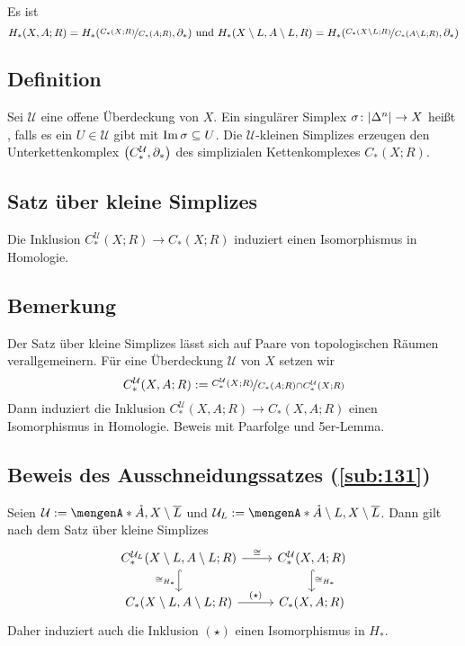 Es ist 
\[
	H_*(X,A;R) = H_* \enbrace*{\nicefrac{C_*(X;R)}{C_*(A;R)},\partial_*}  \text{ und } H_*\enbrace*{X\setminus L, A \setminus L,R} = H_* \enbrace*{ 
	\nicefrac{C_*(X \setminus L;R)}{C_*(A \setminus L;R)}, \partial_*}  
\]

\subsection[Definition: $\mathcal{U}$-klein]{Definition} %
\label{sub:132}
Sei $\mathcal{U}$ eine offene Überdeckung von $X$. Ein singulärer Simplex $\sigma \colon \abs*{\Delta^n} \to X$ heißt 
, falls es ein $U \in \mathcal{U}$ gibt mit $\im \sigma  \subseteq U$. Die $\mathcal{U}$-kleinen Simplizes 
erzeugen den Unterkettenkomplex $\enbrace*{C_*^{\mathcal{U}},\partial_*}$ des simplizialen Kettenkomplexes $C_*(X;R)$.

\subsection{Satz über kleine Simplizes} %
\label{sub:133}
Die Inklusion $C_*^\mathcal{U}(X;R) \to C_*(X;R)$ induziert einen Isomorphismus in Homologie.

\subsection{Bemerkung} %
\label{sub:134}
Der Satz über kleine Simplizes lässt sich auf Paare von topologischen Räumen verallgemeinern. Für eine Überdeckung $\mathcal{U}$ von $X$ setzen wir 
\[
	C_*^\mathcal{U} \enbrace*{X,A;R} := \nicefrac{C_*^\mathcal{U}(X;R)}{C_*(A;R) \cap C_*^\mathcal{U}(X;R)} 
\]
Dann induziert die Inklusion $C_*^\mathcal{U}(X,A;R) \to C_*(X,A;R)$ einen Isomorphismus in Homologie. Beweis mit Paarfolge und 5er-Lemma.

\subsection{Beweis des Ausschneidungssatzes (\ref{sub:131})} %
\label{sub:135}
Seien $\mathcal{U} := \set{\mathring{A},X \setminus \overline{L}}$ und $\mathcal{U}_L := \set{\mathring{A} \setminus L, X \setminus \overline{L}}$. Dann gilt nach
dem Satz über kleine Simplizes
\[
	\begin{tikzcd}
		C_*^{\mathcal{U}_L} \enbrace*{X \setminus L, A \setminus L;R} \rar["\cong"] \dar[hook,"\cong_{H_*}"']
		& C_*^\mathcal{U}(X,A;R) \dar[hook,"\cong_{H_*}"] \\
		C_*(X \setminus L, A \setminus L;R) \rar["(\star)"] & C_*(X,A;R)
	\end{tikzcd}
\]
Daher induziert auch die Inklusion $(\star)$ einen Isomorphismus in $H_*$. \bewende

